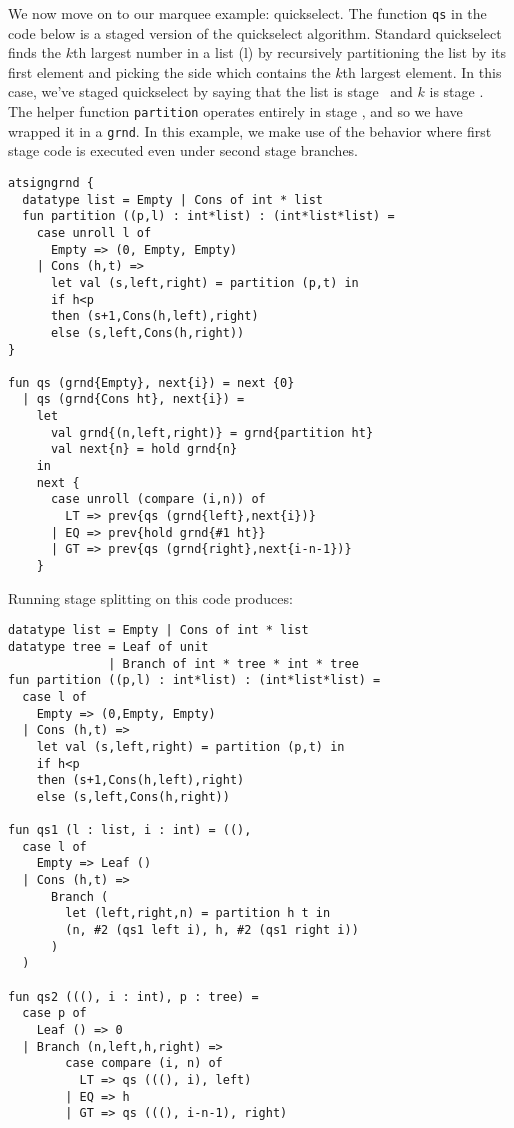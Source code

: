 
We now move on to our marquee example: quickselect.
The function {\tt qs} in the code below is a staged version of the quickselect algorithm.
Standard quickselect finds the $k$th largest number in a list (l) by recursively partitioning the list by its 
first element and picking the side which contains the $k$th largest element.
In this case, we've staged quickselect by saying that the list is stage \bbone\ and $k$ is stage \bbtwo.
The helper function {\tt partition} operates entirely in stage \bbone, and so we have wrapped it in a \texttt{grnd}.
In this example, we make use of the behavior where first stage code is executed even under second stage branches.

\begin{lstlisting} 
atsigngrnd { 
  datatype list = Empty | Cons of int * list
  fun partition ((p,l) : int*list) : (int*list*list) = 
    case unroll l of 
      Empty => (0, Empty, Empty) 
    | Cons (h,t) => 
      let val (s,left,right) = partition (p,t) in 
      if h<p 
      then (s+1,Cons(h,left),right) 
      else (s,left,Cons(h,right))
}

fun qs (grnd{Empty}, next{i}) = next {0} 
  | qs (grnd{Cons ht}, next{i}) =
    let 
      val grnd{(n,left,right)} = grnd{partition ht}
      val next{n} = hold grnd{n}
    in
    next { 
      case unroll (compare (i,n)) of
        LT => prev{qs (grnd{left},next{i})}
      | EQ => prev{hold grnd{#1 ht}}
      | GT => prev{qs (grnd{right},next{i-n-1})}
    }
\end{lstlisting}
Running stage splitting on this code produces:
\begin{lstlisting} 
datatype list = Empty | Cons of int * list
datatype tree = Leaf of unit 
              | Branch of int * tree * int * tree
fun partition ((p,l) : int*list) : (int*list*list) = 
  case l of 
    Empty => (0,Empty, Empty) 
  | Cons (h,t) => 
    let val (s,left,right) = partition (p,t) in 
    if h<p 
    then (s+1,Cons(h,left),right) 
    else (s,left,Cons(h,right))

fun qs1 (l : list, i : int) = ((), 
  case l of
    Empty => Leaf ()
  | Cons (h,t) => 
      Branch (
        let (left,right,n) = partition h t in
        (n, #2 (qs1 left i), h, #2 (qs1 right i))
      )
  )

fun qs2 (((), i : int), p : tree) = 
  case p of
    Leaf () => 0
  | Branch (n,left,h,right) =>
        case compare (i, n) of 
          LT => qs (((), i), left) 
        | EQ => h 
        | GT => qs (((), i-n-1), right)

\end{lstlisting}

